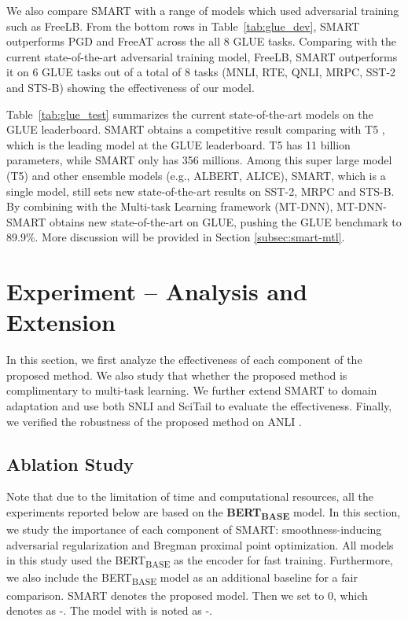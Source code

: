 \documentclass[11pt]{article} \usepackage{url}
\newcommand\model{SMART}
\begin{document}
We also compare {\model} with a range of models which used adversarial training such as FreeLB. From the bottom rows in Table~\ref{tab:glue_dev}, {\model} outperforms PGD and FreeAT across the all 8 GLUE tasks. Comparing with the current state-of-the-art adversarial training model, FreeLB, {\model} outperforms it on 6 GLUE tasks out of a total of 8 tasks (MNLI, RTE, QNLI, MRPC, SST-2 and STS-B) showing the effectiveness of our model. 

Table~\ref{tab:glue_test} summarizes the current state-of-the-art models on the GLUE leaderboard. {\model} obtains a competitive result comparing with T5 \cite{raffel2019t5}, which is the leading model at the GLUE leaderboard. T5 has 11 billion parameters, while {\model} only has 356 millions. Among this super large model (T5) and other ensemble models (e.g., ALBERT, ALICE), {\model}, which is a single model, still sets new state-of-the-art results on SST-2, MRPC and STS-B. By combining with the Multi-task Learning framework (MT-DNN), MT-DNN-{\model} obtains new state-of-the-art on GLUE, pushing the GLUE benchmark to 89.9\%. More discussion will be provided in Section \ref{subsec:smart-mtl}.

 \vspace{-0.05in}
\section{Experiment -- Analysis and Extension}
\label{sec:exp_analysis}
\vspace{-0.05in}

In this section, we first analyze the effectiveness of each component of the proposed method. We also study that whether the proposed method is complimentary to multi-task learning. We further extend SMART to domain adaptation and use both SNLI \cite{snli2015} and SciTail \cite{scitail} to evaluate the effectiveness. Finally, we verified the robustness of the proposed method on ANLI \cite{nie2019adversarial}. 

\subsection{Ablation Study}
\label{subsec:abl}


Note that due to the limitation of time and computational resources, all the experiments reported below are based on the \textbf{BERT\textsubscript{BASE}} model.
In this section, we study the importance of each component of {\model}: smoothness-inducing adversarial regularization and Bregman proximal point optimization. All models in this study used the BERT\textsubscript{BASE} as the encoder for fast training. Furthermore, we also include the BERT\textsubscript{BASE} model as an additional baseline for a fair comparison. {\model} denotes the proposed model. Then we set  to 0, which denotes as -. The model with  is noted as -.
\end{document}
